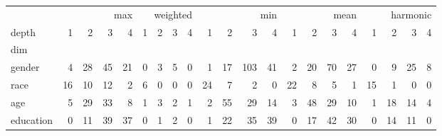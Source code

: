 \begin{tabular}{lrrrrrrrrrrrrrrrrrrrr}
\toprule
 & \multicolumn{4}{r}{max} & \multicolumn{4}{r}{weighted} & \multicolumn{4}{r}{min} & \multicolumn{4}{r}{mean} & \multicolumn{4}{r}{harmonic} \\
depth & 1 & 2 & 3 & 4 & 1 & 2 & 3 & 4 & 1 & 2 & 3 & 4 & 1 & 2 & 3 & 4 & 1 & 2 & 3 & 4 \\
dim &  &  &  &  &  &  &  &  &  &  &  &  &  &  &  &  &  &  &  &  \\
\midrule
gender & 4 & 28 & 45 & 21 & 0 & 3 & 5 & 0 & 1 & 17 & 103 & 41 & 2 & 20 & 70 & 27 & 0 & 9 & 25 & 8 \\
race & 16 & 10 & 12 & 2 & 6 & 0 & 0 & 0 & 24 & 7 & 2 & 0 & 22 & 8 & 5 & 1 & 15 & 1 & 0 & 0 \\
age & 5 & 29 & 33 & 8 & 1 & 3 & 2 & 1 & 2 & 55 & 29 & 14 & 3 & 48 & 29 & 10 & 1 & 18 & 14 & 4 \\
education & 0 & 11 & 39 & 37 & 0 & 1 & 2 & 0 & 1 & 22 & 35 & 39 & 0 & 17 & 42 & 30 & 0 & 14 & 11 & 0 \\
\bottomrule
\end{tabular}

